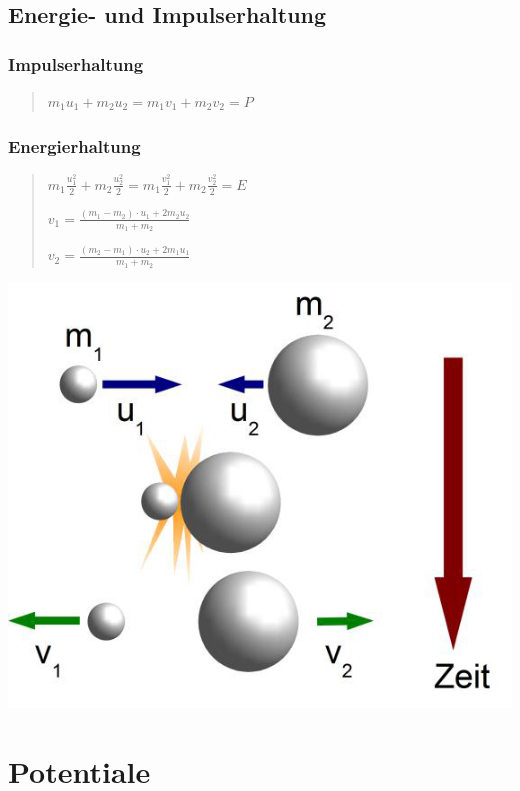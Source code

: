 \subsection*{Energie- und Impulserhaltung}


\subsubsection*{Impulserhaltung}
\begin{verse}
$m_{1}u_{1}+m_{2}u_{2}=m_{1}v_{1}+m_{2}v_{2}=P$
\end{verse}

\subsubsection*{Energierhaltung}
\begin{verse}
$m_{1}\frac{u_{1}^{2}}{2}+m_{2}\frac{u_{2}^{2}}{2}=m_{1}\frac{v_{1}^{2}}{2}+m_{2}\frac{v_{2}^{2}}{2}=E$

$v_{1}=\frac{(m_{1}-m_{2})\cdot u_{1}+2m_{2}u_{2}}{m_{1}+m_{2}}$

$v_{2}=\frac{(m_{2}-m_{1})\cdot u_{2}+2m_{1}u_{1}}{m_{1}+m_{2}}$
\end{verse}
\includegraphics[scale=0.5]{Energie-Leistung-Potentiale/Impulserhaltung}


\section*{Potentiale}


